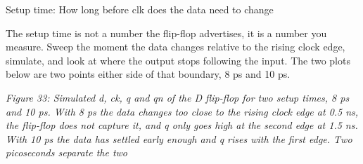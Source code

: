 \begin{Shaded}
\begin{Highlighting}[]
\OperatorTok{/}\OperatorTok{/}\OperatorTok{:}

        
   
      
     
       
       
     
       
        
     
\end{Highlighting}
\end{Shaded}

Setup time: How long before clk does the data need to change

The setup time is not a number the flip-flop advertises, it is a number
you measure. Sweep the moment the data changes relative to the rising
clock edge, simulate, and look at where the output stops following the
input. The two plots below are two points either side of that boundary,
8 ps and 10 ps.


{
\centering
{}
}


{
\centering
{}
}

\emph{Figure 33: Simulated d, ck, q and qn of the D flip-flop for two
setup times, 8 ps and 10 ps. With 8 ps the data changes too close to the
rising clock edge at 0.5 ns, the flip-flop does not capture it, and q
only goes high at the second edge at 1.5 ns. With 10 ps the data has
settled early enough and q rises with the first edge. Two picoseconds
separate the two}

